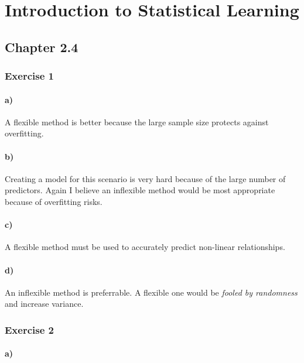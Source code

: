 \documentclass[10pt,a4paper]{article}
\begin{document}
\section{Introduction to Statistical Learning}

\subsection{Chapter 2.4}

\subsubsection{Exercise 1}

\paragraph{a)}

A flexible method is better because the large sample size protects
against overfitting.

\paragraph{b)}

Creating a model for this scenario is very hard because of the large
number of predictors. Again I believe an inflexible method would be
most appropriate because of overfitting risks.

\paragraph{c)}

A flexible method must be used to accurately predict non-linear
relationships.

\paragraph{d)}

An inflexible method is preferrable. A flexible one would be
\textit{fooled by randomness} and increase variance.

\subsubsection{Exercise 2}

\paragraph{a)}
\end{document}
